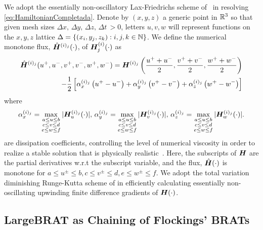 We adopt the essentially non-oscillatory Lax-Friedrichs scheme of~\cite{OsherShuENO, Crandall1984Approx} in resolving \eqref{eq:HamiltonianCompletada}. Denote by $(x, y, z)$ a generic point in $\mathbb{R}^3$ so that given mesh sizes $\Delta x, \, \Delta y, \, \Delta z, \, \Delta t \, > 0$, letters $u,v,w$ will represent functions on the $x,y,z$ lattice $\Delta=\{(x_i,y_j, z_k): i, j, k \in \mathbb{N}\}$. We define the numerical monotone flux, 	$\hat{\bm{H}}^{(i)_j}(\cdot)$, of $\bm{H}_j^{(i)}(\cdot)$ as 
%
\begin{align}
	\hat{\bm{H}}^{(i)_j}(u^+, u^-, v^+, v^-, w^+, w^-) = \bm{H}^{(i)_j}\left(\frac{u^+ +u^-}{2}, \frac{v^+ +v^-}{2}, \frac{w^+ +w^-}{2}\right) \nonumber
	\\
	- \dfrac{1}{2}\left[ \alpha_x^{(i)_j} \left(u^+ - u^-\right) + \alpha_y^{(i)_j}\left(v^+ - v^-\right) + \alpha_z^{(i)_j}\left(w^+ - w^-\right)\right]
\end{align}
%
where
%
\begin{align}
	\alpha_x^{(i)_j} = \max_{\substack{ a \le u \le b \\ c \le v \le d  \\ e \le w \le f}} |\hamfunc_{u}^{(i)_j}(\cdot)|, %
	\, \alpha_y^{(i)_j} = \max_{\substack{ a \le u \le b \\ c \le v \le d  \\ e \le w \le f}} |\hamfunc_{v}^{(i)_j}(\cdot)|, %
	\, \alpha_z^{(i)_j} = \max_{\substack{ a \le u \le b \\ c \le v \le d  \\ e \le w \le f}} |\hamfunc_{w}^{(i)_j}(\cdot)|. %
\end{align}
%
are dissipation coefficients, controlling the level of numerical viscosity in order to realize a stable solution that is physically realistic~\cite{Crandall1984Approx}. Here, the subscripts of $\bm{H}$ are the partial derivatives w.r.t the subscript variable, and the flux, $\hat{\bm{H}}(\cdot)$ is monotone for $a \le u^\pm \le b, c \le v^\pm \le d, e \le w^\pm \le f$. We adopt the total variation diminishing Runge-Kutta scheme of \cite{Osher1987} in efficiently calculating essentially non-oscillating upwinding finite difference gradients of $\bm{H}(\cdot)$.

\subsection{LargeBRAT as Chaining of Flockings' BRATs}
% 
\label{sucsec:murmur_funnels}

